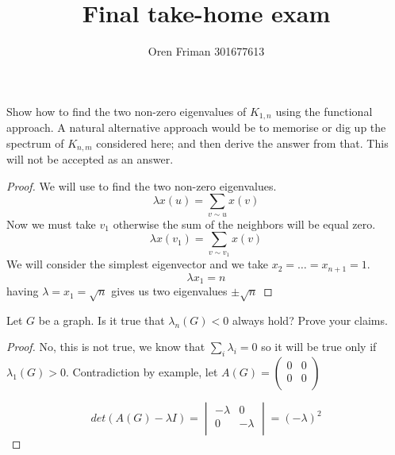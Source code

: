 \documentclass[a4paper, 11pt, oneside]{article}
\newenvironment{problem}[1]
  {\renewcommand\theinnercustomprob{#1}\innercustomprob}
  {\endinnercustomprob}
\begin{document}
\title{Final take-home exam}
\author{Oren Friman 301677613}
\maketitle
				   
\begin{problem}{1}\label{problem1}
Show how to find the two non-zero eigenvalues of $K_{1,n}$ using the functional
approach. A natural alternative approach would be to memorise or dig up the spectrum of $K_{n,m}$
considered here; and then derive the answer from that. This will not be accepted as an answer.
\end{problem}

\begin{proof}
We will use \cite[Equation 1]{adjacency_matrix} to find  the two non-zero eigenvalues.
\begin{equation*}
\lambda x(u) = \sum_{v \sim u} x(v)
\end{equation*}
Now we must take $v_1$ otherwise the sum of the neighbors will be equal zero.
\begin{equation*}
\lambda x(v_1) = \sum_{v \sim v_1} x(v)
\end{equation*}
We will consider the simplest eigenvector  and we take $x_2 = \ldots = x_{n+1} = 1$.
\begin{equation*}
\lambda x_1 = n
\end{equation*}
having $\lambda = x_1 = \sqrt{n}$ gives us two eigenvalues $\pm \sqrt{n}$
\end{proof}		

\begin{problem}{2}\label{problem2}
Let $G$ be a graph. Is it true that $\lambda_n(G) < 0$ always hold? Prove your claims.
\end{problem}

\begin{proof}
No, this is not true, we know that $\sum_i \lambda_i = 0$ so it will be true only if $\lambda_1(G) > 0$.
Contradiction by example, let $A(G) = 
\begin{pmatrix}
0 & 0  \\
0& 0  \\
\end{pmatrix}$

\begin{equation*}
det(A(G) - \lambda I) =
\begin{vmatrix}
-\lambda & 0            \\ 
0             & -\lambda \\
\end{vmatrix} = (-\lambda)^2
\end{equation*}
\end{proof}		
   
\end{document}
